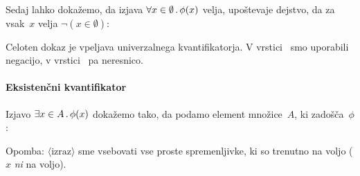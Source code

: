 \begin{zgled}
  \label{zgled:vse-v-prazni}
  Sedaj lahko dokažemo, da izjava $\forall x \in \emptyset \,.\, \phi(x)$ velja, upoštevaje dejstvo, da za vsak~$x$ velja
  $\neg (x \in \emptyset)$:
  \begin{boxDisplay}
  \begin{boxedProof}[numbered]
    \begin{boxFrame}
    \end{boxFrame}
  \end{boxedProof}
  \end{boxDisplay}
  Celoten dokaz je vpeljava univerzalnega kvantifikatorja.
  V vrstici~ smo uporabili negacijo, v vrstici~ pa neresnico.
\end{zgled}


\paragraph*{Eksistenčni kvantifikator}
\label{sec:eksistencni-kvantifikator-pravila}

Izjavo $\exists x \in A \,.\, \phi(x)$ dokažemo tako, da podamo element množice~$A$, ki zadošča~$\phi$:
%
\begin{boxDisplay}
  \begin{boxedProof}
    \begin{boxFrame}
      \begin{boxNested}[1]
      \end{boxNested}
      \begin{boxNested}[1]
      \end{boxNested}
    \end{boxFrame}
  \end{boxedProof}
\end{boxDisplay}
%
Opomba: $\langle\text{izraz}\rangle$ sme vsebovati vse proste spremenljivke, ki so trenutno na voljo ($x$ \emph{ni} na
voljo).

